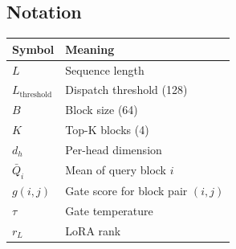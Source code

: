 \subsection{Notation}

\begin{table}[H]
\centering
\small
\begin{tabular}{ll}
\toprule
\textbf{Symbol} & \textbf{Meaning} \\
\midrule
$L$ & Sequence length \\
$L_\text{threshold}$ & Dispatch threshold (128) \\
$B$ & Block size (64) \\
$K$ & Top-K blocks (4) \\
$d_h$ & Per-head dimension \\
$\bar{Q}_i$ & Mean of query block $i$ \\
$g(i, j)$ & Gate score for block pair $(i, j)$ \\
$\tau$ & Gate temperature \\
$r_L$ & LoRA rank \\
\bottomrule
\end{tabular}
\end{table}

